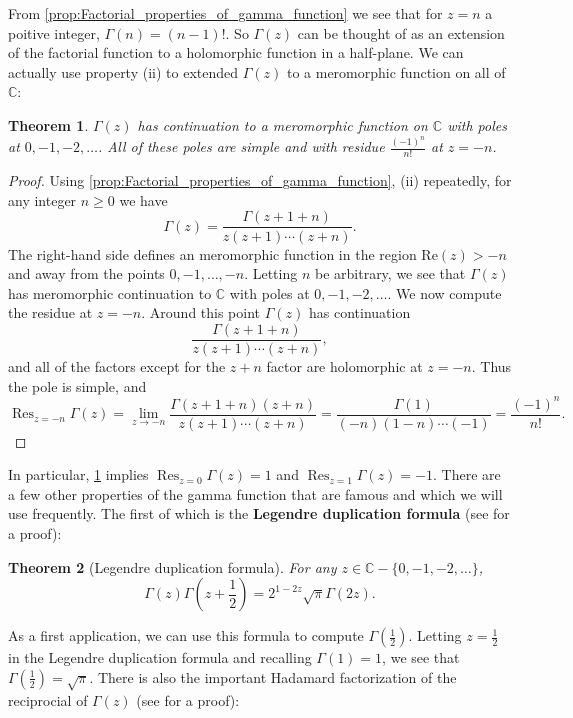 \documentclass[12pt]{book}
\newtheorem{theorem}{Theorem}[section]
\theoremstyle{definition}\newframedtheorem{method}{Method}
\newcommand{\C}{\mathbb{C}}
\newcommand{\G}{\Gamma}
\newcommand{\<}{\langle}
\renewcommand{\>}{\rangle}
\DeclareMathOperator*{\Res}{\mathrm{Res}}
\renewcommand{\Re}{\mathrm{Re}}
\begin{document}
    From \cref{prop:Factorial_properties_of_gamma_function} we see that for $z = n$ a poitive integer, $\G(n) = (n-1)!$. So $\G(z)$ can be thought of as an extension of the factorial function to a holomorphic function in a half-plane. We can actually use property (ii) to extended $\G(z)$ to a meromorphic function on all of $\C$:

    \begin{theorem}\label{thm:continuation_of_gamma_function}
      $\G(z)$ has continuation to a meromorphic function on $\C$ with poles at $0,-1,-2,\ldots$. All of these poles are simple and with residue $\frac{(-1)^{n}}{n!}$ at $z = -n$.
    \end{theorem}
    \begin{proof}
      Using \cref{prop:Factorial_properties_of_gamma_function}, (ii) repeatedly, for any integer $n \ge 0$ we have
      \[
        \G(z) = \frac{\G(z+1+n)}{z(z+1) \cdots (z+n)}.
      \]
      The right-hand side defines an meromorphic function in the region $\Re(z) > -n$ and away from the points $0,-1,\ldots,-n$. Letting $n$ be arbitrary, we see that $\G(z)$ has meromorphic continuation to $\C$ with poles at $0,-1,-2,\ldots$. We now compute the residue at $z = -n$. Around this point $\G(z)$ has continuation
      \[
        \frac{\G(z+1+n)}{z(z+1) \cdots (z+n)},
      \]
      and all of the factors except for the $z+n$ factor are holomorphic at $z = -n$. Thus the pole is simple, and
      \[
        \Res_{z = -n}\G(z) = \lim_{z \to -n}\frac{\G(z+1+n)(z+n)}{z(z+1) \cdots (z+n)} = \frac{\G(1)}{(-n)(1-n) \cdots (-1)} = \frac{(-1)^{n}}{n!}.
      \]
    \end{proof}

    In particular, \cref{thm:continuation_of_gamma_function} implies $\Res_{z = 0}\G(z) = 1$ and $\Res_{z = 1}\G(z) = -1$. There are a few other properties of the gamma function that are famous and which we will use frequently. The first of which is the \textbf{Legendre duplication formula} (see \cite{remmert2013classical} for a proof):

    \begin{theorem}[Legendre duplication formula]
      For any $z \in \C-\{0,-1,-2,\ldots\}$,
      \[
        \G(z)\G\left(z+\frac{1}{2}\right) = 2^{1-2z}\sqrt{\pi}\G(2z).
      \]
    \end{theorem}

    As a first application, we can use this formula to compute $\G\left(\frac{1}{2}\right)$. Letting $z = \frac{1}{2}$ in the Legendre duplication formula and recalling $\G(1) = 1$, we see that $\G\left(\frac{1}{2}\right) = \sqrt{\pi}$. There is also the important Hadamard factorization of the reciprocial of $\G(z)$ (see \cite{stein2010complex} for a proof):
\end{document}
